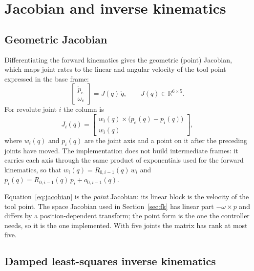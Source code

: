 \documentclass[11pt,a4paper]{article}
\begin{document}
\section{Jacobian and inverse kinematics}\label{sec:ik}

\subsection{Geometric Jacobian}

Differentiating the forward kinematics gives the geometric (point) Jacobian, which maps joint rates to the linear and angular velocity of the tool point expressed in the base frame:
\begin{equation}
  \begin{bmatrix}\dot p_e\\ \omega_e\end{bmatrix}
  = J(q)\,\dot q,
  \qquad J(q)\in\mathbb{R}^{6\times5}.
  \label{eq:jacobian}
\end{equation}
For revolute joint $i$ the column is
\begin{equation}
  J_i(q)=
  \begin{bmatrix}
    w_i(q)\times\bigl(p_e(q)-p_i(q)\bigr)\\[2pt]
    w_i(q)
  \end{bmatrix},
  \label{eq:jacobian-column}
\end{equation}
where $w_i(q)$ and $p_i(q)$ are the joint axis and a point on it after the preceding joints have moved. The implementation does not build intermediate frames: it carries each axis through the same product of exponentials used for the forward kinematics, so that $w_i(q)=R_{0,i-1}(q)\,w_i$ and $p_i(q)=R_{0,i-1}(q)\,p_i+o_{0,i-1}(q)$.

Equation~\eqref{eq:jacobian} is the \emph{point} Jacobian: its linear block is the velocity of the tool point. The space Jacobian used in Section~\ref{sec:fk} has linear part $-\omega\times p$ and differs by a position-dependent transform; the point form is the one the controller needs, so it is the one implemented. With five joints the matrix has rank at most five.

\subsection{Damped least-squares inverse kinematics}
\end{document}
